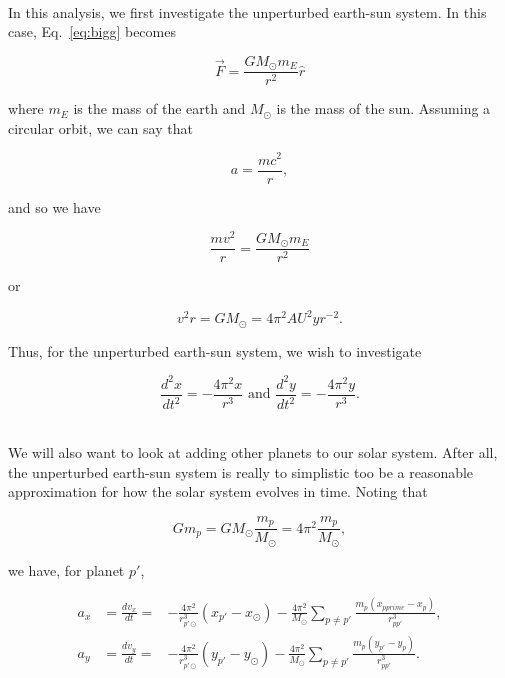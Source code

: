 \documentclass[12pt]{article}
\numberwithin{equation}{section}
\begin{document}
\\\indent In this analysis, we first investigate the unperturbed earth-sun system.  In this case, Eq.~\ref{eq:bigg} becomes

\begin{equation}
\label{eq:earthsunbigg}
\vec{F} = \frac{GM_{\odot}m_{E}}{r^{2}}\hat{r}
\end{equation}

\noindent where $m_{E}$ is the mass of the earth and $M_{\odot}$ is the mass of the sun.  Assuming a circular orbit, we can say that 

$$a = \frac{mc^{2}}{r},$$

\noindent and so we have

$$\frac{mv^{2}}{r} = \frac{GM_{\odot}m_{E}}{r^{2}}$$

\noindent or

$$v^{2}r = GM_{\odot} = 4\pi^{2} AU^{2}yr^{-2}.$$

\noindent Thus, for the unperturbed earth-sun system, we wish to investigate

\begin{equation}
\label{eq:earthsun}
\frac{d^{2}x}{dt^{2}} = -\frac{4\pi^{2}x}{r^{3}} \text{ and } \frac{d^{2}y}{dt^{2}} = -\frac{4\pi^{2}y}{r^{3}}.
\end{equation}

\\\indent We will also want to look at adding other planets to our solar system.  After all, the unperturbed earth-sun system is really to simplistic too be a reasonable approximation for how the solar system evolves in time.  Noting that

$$Gm_{p} = GM_{\odot}\frac{m_{p}}{M_{\odot}}=4\pi^{2}\frac{m_{p}}{M_{\odot}},$$

\noindent we have, for planet $p\prime$,

\begin{equation}
\label{eq:multiplanet}
\begin{align}
a_{x} &=  \frac{dv_{x}}{dt} =&  -\frac{4\pi^{2}}{r_{p\prime\odot}^{3}}\left(x_{p\prime} - x_{\odot}\right) - \frac{4\pi^{2}}{M_{\odot}}\sum_{p\neq p\prime}\frac{m_{p}\left(x_{pprime} - x_{p}\right)}{r_{pp\prime}^{3}}, \\
a_{y} &=  \frac{dv_{y}}{dt} =&  -\frac{4\pi^{2}}{r_{p\prime\odot}^{3}}\left(y_{p\prime} - y_{\odot}\right) - \frac{4\pi^{2}}{M_{\odot}}\sum_{p\neq p\prime}\frac{m_{p}\left(y_{p\prime} - y_{p}\right)}{r_{pp\prime}^{3}}.
\end{align}
\end{equation}
\end{document}
